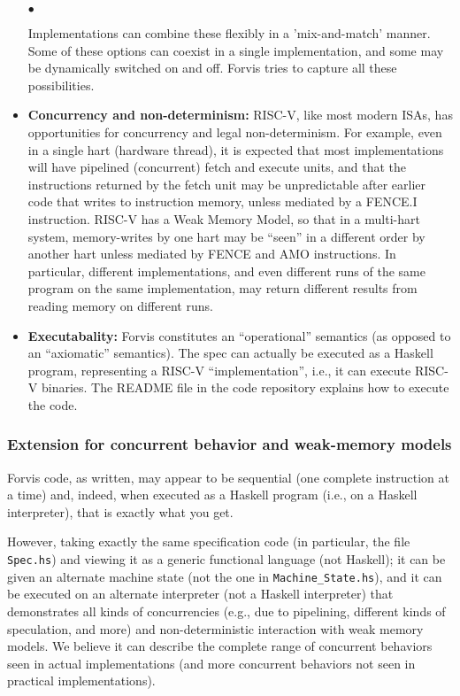 \documentclass[11pt]{article}
\newenvironment{tightlist}%
{\begin{list}{$\bullet$}{%
    \setlength{\topsep}{0in}
    \setlength{\partopsep}{0in}
    \setlength{\itemsep}{0in}
    \setlength{\parsep}{0in}
    \setlength{\leftmargin}{1.5em}
    \setlength{\rightmargin}{0in}
    \setlength{\itemindent}{0in}
}
}%
{\end{list}
}
\begin{document}
\begin{itemize}
\begin{tightlist}
  \end{tightlist}

  Implementations can combine these flexibly in a 'mix-and-match'
  manner.  Some of these options can coexist in a single
  implementation, and some may be dynamically switched on and off.
  Forvis tries to capture all these possibilities.

\item {\bf Concurrency and non-determinism:} RISC-V, like most modern
ISAs, has opportunities for concurrency and legal non-determinism.
For example, even in a single hart (hardware thread), it is expected
that most implementations will have pipelined (concurrent) fetch and
execute units, and that the instructions returned by the fetch unit
may be unpredictable after earlier code that writes to instruction
memory, unless mediated by a FENCE.I instruction.  RISC-V has a Weak
Memory Model, so that in a multi-hart system, memory-writes by one
hart may be ``seen'' in a different order by another hart unless
mediated by FENCE and AMO instructions.  In particular, different
implementations, and even different runs of the same program on the
same implementation, may return different results from reading memory
on different runs.

\item {\bf Executabality:} Forvis constitutes an ``operational''
semantics (as opposed to an ``axiomatic'' semantics).  The spec can
actually be executed as a Haskell program, representing a RISC-V
``implementation'', i.e., it can execute RISC-V binaries.  The README
file in the code repository explains how to execute the code.

\end{itemize}


\subsubsection{Extension for concurrent behavior and weak-memory models}

Forvis code, as written, may appear to be sequential (one complete
instruction at a time) and, indeed, when executed as a Haskell program
(i.e., on a Haskell interpreter), that is exactly what you get.

However, taking exactly the same specification code (in particular,
the file \verb|Spec.hs|) and viewing it as a generic functional
language (not Haskell); it can be given an alternate machine state
(not the one in \verb|Machine_State.hs|), and it can be executed on an
alternate interpreter (not a Haskell interpreter) that demonstrates
all kinds of concurrencies (e.g., due to pipelining, different kinds
of speculation, and more) and non-deterministic interaction with weak
memory models.  We believe it can describe the complete range of
concurrent behaviors seen in actual implementations (and more
concurrent behaviors not seen in practical implementations).
\end{document}
